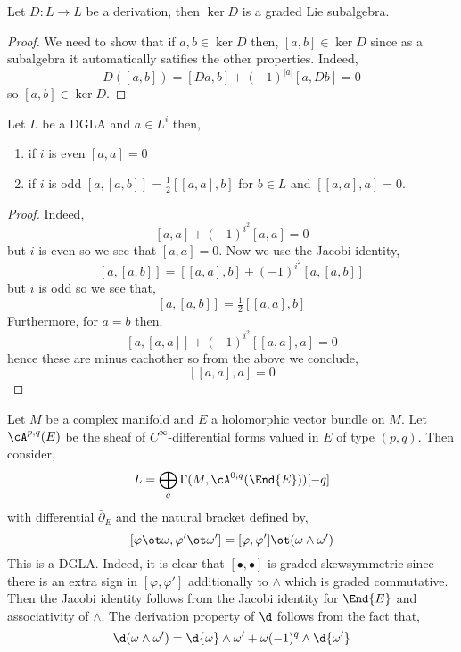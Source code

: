\documentclass[12pt]{article}
\begin{document}
\begin{prop}
Let $D : L \to L$ be a derivation, then $\ker{D}$ is a graded Lie subalgebra.
\end{prop}

\begin{proof}
We need to show that if $a, b \in \ker{D}$ then, $[a,b] \in \ker{D}$ since as a subalgebra it automatically satifies the other properties. Indeed, 
\[ D([a,b]) = [Da, b] + (-1)^{|a|} [a, Db] = 0 \]
so $[a,b] \in \ker{D}$.
\end{proof}

\begin{prop}
Let $L$ be a DGLA and $a \in L^i$ then,
\begin{enumerate}
\item if $i$ is even $[a,a] = 0$
\item if $i$ is odd $[a, [a,b]] = \tfrac{1}{2} [[a,a],b]$ for $b \in L$ and $[[a,a],a] = 0$.
\end{enumerate}
\end{prop}
\begin{proof}
Indeed,
\[ [a,a] + (-1)^{i^2} [a,a] = 0 \]
but $i$ is even so we see that $[a,a] = 0$. Now we use the Jacobi identity,
\[ [a,[a,b]] = [[a,a], b] + (-1)^{i^2} [a,[a,b]] \]
but $i$ is odd so we see that,
\[ [a,[a,b]] = \tfrac{1}{2} [[a,a],b] \]
Furthermore, for $a = b$ then,
\[ [a,[a,a]] + (-1)^{i^2} [[a,a],a] = 0 \]
hence these are minus eachother so from the above we conclude,
\[ [[a,a],a] = 0 \]
\end{proof}

\begin{example}
Let $M$ be a complex manifold and $E$ a holomorphic vector bundle on $M$. Let $\cA^{p,q}(E)$ be the sheaf of $C^{\infty}$-differential forms valued in $E$ of type $(p,q)$. Then consider,
\[ L = \bigoplus_q \Gamma(M, \cA^{0,q}(\End{E})) [-q] \]
with differential $\bar{\partial}_E$ and the natural bracket defined by,
\[ [\varphi \ot \omega, \varphi' \ot \omega'] = [\varphi, \varphi'] \ot (\omega \wedge \omega') \]
This is a DGLA. Indeed, it is clear that $[\bullet, \bullet]$ is graded skewsymmetric since there is an extra sign in $[\varphi, \varphi']$ additionally to $\wedge$ which is graded commutative. Then the Jacobi identity follows from the Jacobi identity for $\End{E}$ and associativity of $\wedge$. The derivation property of $\d$ follows from the fact that,
\[ \d (\omega \wedge \omega') = \d{\omega} \wedge \omega' + \omega (-1)^{q} \wedge \d{\omega'} \]
\end{example}
\end{document}

